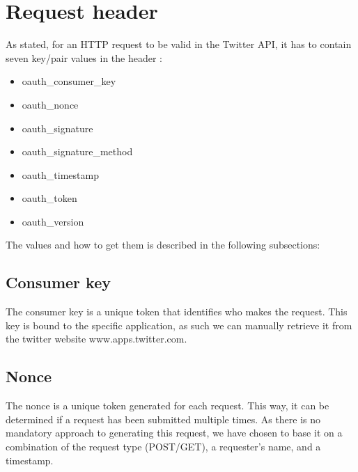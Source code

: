 \section{Request header}
As stated, for an \ac{HTTP} request to be valid in the Twitter API, it has to
contain seven key/pair values in the header \citep{TwitterAPIAuth}:

\begin{itemize}
  \item oauth\_consumer\_key
  \item oauth\_nonce
  \item oauth\_signature
  \item oauth\_signature\_method
  \item oauth\_timestamp
  \item oauth\_token
  \item oauth\_version
\end{itemize}

The values and how to get them is described in the following subsections:

\subsection*{Consumer key}
The consumer key is a unique token that identifies who makes the request.
This key is bound to the specific application, as such we can manually retrieve
it from the twitter website www.apps.twitter.com.

\subsection*{Nonce}
The nonce is a unique token generated for each request. This way, it can be
determined if a request has been submitted multiple times. As there is no
mandatory approach to generating this request, we have chosen to base it on a
combination of the request type (POST/GET), a requester's name, and a timestamp.

